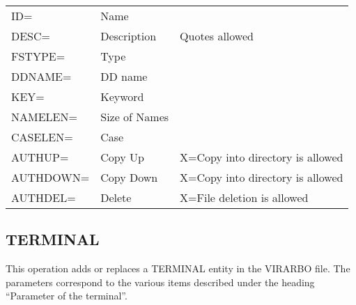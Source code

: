 \documentclass[letterpaper,10pt,english]{sphinxmanual}
\begin{document}
\begin{savenotes}\sphinxattablestart
\centering
\begin{tabulary}{\linewidth}[t]{|T|T|T|}
\hline
{}\relax &\relax &\relax \\
\hline
ID=
&
Name
&\\
\hline
DESC=
&
Description
&
Quotes allowed
\\
\hline
FSTYPE=
&
Type
&\\
\hline
DDNAME=
&
DD name
&\\
\hline
KEY=
&
Keyword
&\\
\hline
NAMELEN=
&
Size of Names
&\\
\hline
CASELEN=
&
Case
&\\
\hline
AUTHUP=
&
Copy Up
&
X=Copy into directory is allowed
\\
\hline
AUTHDOWN=
&
Copy Down
&
X=Copy into directory is allowed
\\
\hline
AUTHDEL=
&
Delete
&
X=File deletion is allowed
\\
\hline
\end{tabulary}
\par
\sphinxattableend\end{savenotes}


\subsection{TERMINAL}
\label{\detokenize{Installation_Guide:terminal}}\label{\detokenize{Installation_Guide:index-173}}
This operation adds or replaces a TERMINAL entity in the VIRARBO file. The parameters correspond to the various items described under the heading “Parameter of the terminal”.
\end{document}
